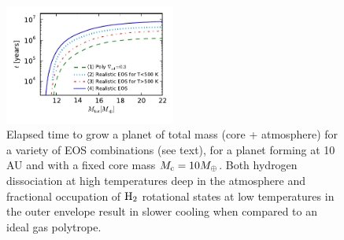 \documentclass[apj]{emulateapj}
\begin{document}

\begin{figure}[h]
\centering
\includegraphics[width=0.5\textwidth]{../../figs/ModelAtmospheres/RadSelfGravRealEOS/PaperFigs/tplot.pdf}
\caption{Elapsed time to grow a planet of total mass (core + atmosphere) for a variety of EOS combinations (see text), for a planet forming at 10 AU and with a fixed core mass $M_{\rm c}=10 M_{\oplus}$. Both hydrogen dissociation at high temperatures deep in the atmosphere and fractional occupation of $\rm H_2$ rotational states at low temperatures in the outer envelope result in slower cooling when compared to an ideal gas polytrope.}
\label{fig:tplotall}
\end{figure}
\end{document}
